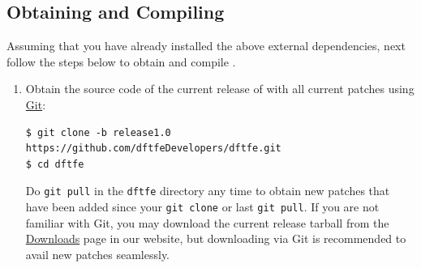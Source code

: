 \subsection{Obtaining and Compiling \dftfe{}}\label{sec:dftfeinstall}
Assuming that you have already installed the above external dependencies, next follow the steps below to obtain and compile \dftfe{}.
\begin{enumerate}
\item Obtain the source code of the current release of \dftfe{} with all current patches using \href{https://git-scm.com/}{Git}:
\begin{verbatim}
$ git clone -b release1.0 https://github.com/dftfeDevelopers/dftfe.git
$ cd dftfe
\end{verbatim}
Do \verb|git pull| in the \verb|dftfe| directory any time to obtain new patches that have been added since your \verb|git clone| or last \verb|git pull|.
If you are not familiar with Git, you may download the current release tarball from the \href{https://sites.google.com/umich.edu/dftfe/download}{Downloads} page in our website, but downloading via Git is recommended to avail new patches seamlessly. 






\end{enumerate}
